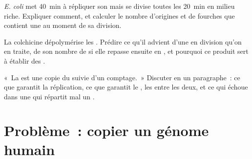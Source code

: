 \begin{exercise}[$\star\star\star$]\label{exo:b1:replication-mitosis:10}
\emph{E. coli} met \qty{40}{min} à répliquer son  mais se
divise toutes les \qty{20}{min} en milieu riche. Expliquer comment, et
calculer le nombre d'origines et de fourches que contient une  au
moment de sa division.
\end{exercise}

\begin{exercise}[$\star\star\star$]\label{exo:b1:replication-mitosis:11}
La colchicine dépolymérise les . Prédire ce qu'il advient
d'une  en division qu'on en traite, de son nombre de 
si elle repasse ensuite en , et pourquoi ce produit sert à
établir des .
\end{exercise}

\begin{exercise}[$\star\star\star$]\label{exo:b1:replication-mitosis:12}
«~La  est une copie du  suivie d'un comptage.~» Discuter en
un paragraphe~: ce que garantit la réplication, ce que garantit le
, les  entre les deux, et ce qui échoue dans une
 qui répartit mal un .
\end{exercise}

\section{Problème~: copier un génome humain}

